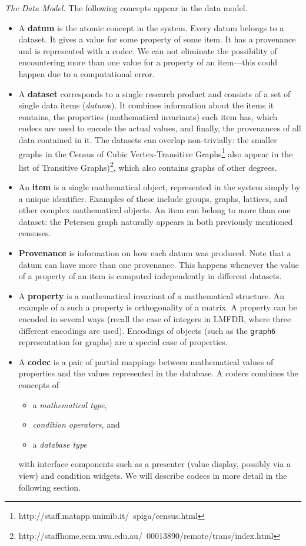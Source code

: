 \medskip

\emph{The \dmh Data Model.} The following concepts appear in the data model.
\begin{itemize}
\item A \textbf{datum} is the atomic concept in the system.
Every datum belongs to a dataset.
It gives a value for some property of some item.
It has a provenance and is represented with a codec.
We can not eliminate the possibility of encountering more than one value
for a property of an item---this could happen due to a computational error.

\item A \textbf{dataset} corresponds to a single research product
and consists of a set of single data items (\emph{datum}s).
It combines information about the items it contains,
the properties (mathematical invariants) each item has,
which codecs are used to encode the actual values,
and finally, the provenances of all data contained in it.
The datasets can overlap non-trivially: 
the smaller graphs in the Census of Cubic Vertex-Transitive Graphs\footnote{http://staff.matapp.unimib.it/~spiga/census.html}
also appear in the list of Transitive Graphs)\footnote{http://staffhome.ecm.uwa.edu.au/~00013890/remote/trans/index.html},
which also contains graphs of other degrees.

\item An \textbf{item} is a single mathematical object, 
represented in the system simply by a unique identifier.
Examples of these include groups, graphs, lattices, and other complex mathematical objects.
An item can belong to more than one dataset:
the Petersen graph naturally appears in both previously mentioned censuses.

\item \textbf{Provenance} is information on how each datum was produced.
Note that a datum can have more than one provenance.
This happens whenever the value of a property of an item is
computed independently in different datasets.

\item A \textbf{property} is a mathematical invariant of a mathematical structure.
An example of a such a property is orthogonality of a matrix.
A property can be encoded in several ways
(recall the case of integers in LMFDB, where three different encodings are used).
Encodings of objects (such as the \texttt{graph6} representation for graphs)
are a special case of properties.

\item A \textbf{codec} is a pair of partial mappings between 
mathematical values of properties and the values represented in the database.
A codecs combines the concepts of 
\begin{itemize}
\item a \emph{mathematical type},
\item \emph{condition operators}, and
\item a \emph{database type}
\end{itemize}
with interface components such as a presenter (value display, possibly via a view) and condition widgets.
We will describe codecs in more detail in the following section.
\end{itemize}

